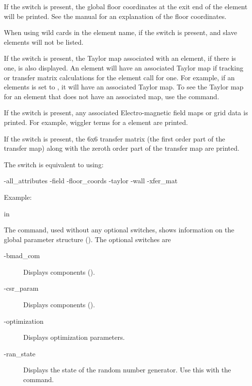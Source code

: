 {{{\begin{description}
If the  switch is present, the global
floor coordinates at the exit end of the element will
be printed. See the \bmad manual for an explanation
of the floor coordinates.

When using wild cards in the element name, if the 
switch is present,  and  slave elements
will not be listed.

If the  switch is present, the Taylor map associated with
an element, if there is one, is also displayed. An element will have
an associated Taylor map if tracking or transfer matrix calculations
for the element call for one. For example, if an elements
 is set to , it will have an associated
Taylor map. To see the Taylor map for an element that does not have an
associated map, use the  command.

If the  switch is present, any associated 
Electro-magnetic field maps or grid data is printed. For example, 
wiggler terms for a   element are printed.

If the  switch is present, the 6x6 transfer matrix (the
first order part of the transfer map) along with the zeroth order part
of the transfer map are printed.

The  switch is equivalent to using:
\begin{example}
  -all_attributes
  -field
  -floor_coords
  -taylor
  -wall
  -xfer_mat
\end{example}

Example:


 in

\item[show global \{-bmad_com\} \{-csr_param\} \{-optimization\} \{-ran_state\} ] \Newline

\vskip -0.2in

The  command, used without any optional switches,
shows information on the global parameter structure
(). The optional switches are
  \begin{description}
  \item[-bmad_com] \Newline
Displays  components ().
  \item[-csr_param] \Newline
Displays  components ().
  \item[-optimization] \Newline
Displays optimization parameters.
  \item[-ran_state] \Newline
Displays the state of the random number generator. Use this with the
 command.
  \end{description}


\end{description}}}}
